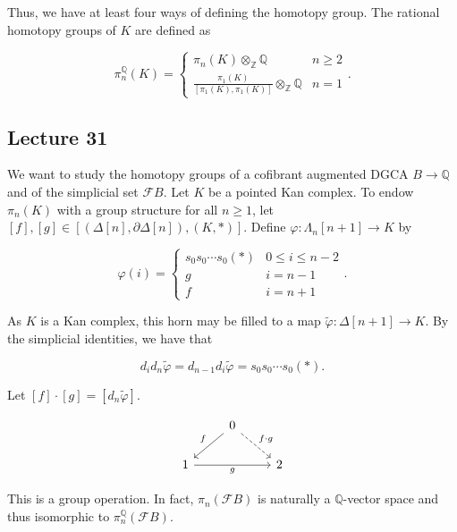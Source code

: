 \documentclass[10pt,letterpaper,cm]{nupset}
\theoremstyle{definition}
\theoremstyle{theorem}
\theoremstyle{remark}
\newcommand{\F}{\mathcal F}
\newcommand{\Q}{\mathbb Q}
\newcommand{\Z}{\mathbb Z}
\newcommand{\1}{\mathbb{1}}
\newcommand{\0}{\vec 0}
\begin{document}
Thus, we have at least four ways of defining the homotopy group. The rational homotopy groups of $K$ are defined as

\[
\pi_n^{\Q}(K) = 
\begin{cases}
\pi_n(K) \otimes_{\Z} \Q & n \geq 2
\\ \frac{\pi_1(K)}{\left[\pi_1(K), \pi_1(K)\right]} \otimes_{\Z} \Q & n =1
\end{cases}
.\]

\subsection{Lecture 31}

We want to study the homotopy groups of  a cofibrant augmented DGCA $B \to \Q$ and of the simplicial set $\F{B}$. Let $K$ be a pointed Kan complex. To endow  $\pi_n(K)$ with a group structure for all $n\geq 1$, let $\left[f\right],\left[g\right] \in  \left[\left(\Delta\left[n\right], \partial{\Delta\left[n\right]}\right), \left(K, \ast\right)\right]$. Define $\varphi : \Lambda_n\left[n+1\right] \to K$ by 

\[
\varphi(i) = \begin{cases}
s_0s_0\cdots s_0(\ast) & 0 \leq i \leq n-2
\\ g & i = n-1
\\ f & i = n+1
\end{cases}
.\]

As $K$ is a Kan complex, this horn may be filled to a map $\tilde{\varphi} : \Delta\left[n+1\right] \to K$. By the simplicial identities, we have that

\[
d_id_n{\tilde{\varphi}} = d_{n-1}d_i{\tilde{\varphi}} = s_0s_0\cdots s_0(\ast)
.\] 

Let  $\left[f\right]\cdot\left[g\right] = \left[d_n{\tilde{\varphi}}\right]$.

\[
\begin{tikzcd}
	& 0 \\
	1 && 2
	\arrow["f"', from=1-2, to=2-1]
	\arrow["g"', from=2-1, to=2-3]
	\arrow["{f\cdot g}", dashed, from=1-2, to=2-3]
\end{tikzcd}
\]

This is a group operation. In fact, $\pi_n(\F{B})$ is naturally a $\Q$-vector space and thus isomorphic to $\pi_n^{\Q}(\F{B})$.
\end{document}

